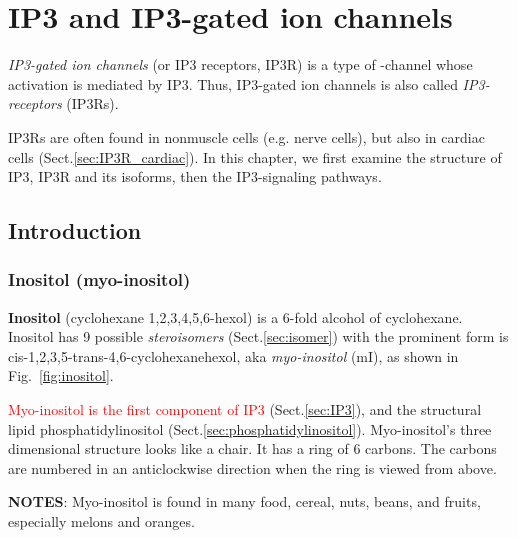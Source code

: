 

\chapter{IP3 and IP3-gated ion channels}
\label{chap:ip3-gated-ion}


{\it IP3-gated ion channels} (or IP3 receptors, IP3R) is a type of
-channel whose activation is mediated by IP3. Thus, IP3-gated ion
channels is also called {\it IP3-receptors} (IP3Rs). 

IP3Rs are often found in nonmuscle cells (e.g. nerve cells), but also in cardiac
cells (Sect.\ref{sec:IP3R_cardiac}). In this chapter, we first examine the
structure of IP3, IP3R and its isoforms, then the IP3-signaling pathways.


\section{Introduction}

\subsection{Inositol (myo-inositol)}
\label{sec:inositol}
\label{sec:myo-inositol}


{\bf Inositol} (cyclohexane 1,2,3,4,5,6-hexol) is a 6-fold alcohol of
cyclohexane. Inositol has 9 possible {\it steroisomers} (Sect.\ref{sec:isomer})
with the prominent form is cis-1,2,3,5-trans-4,6-cyclohexanehexol, aka {\it
myo-inositol} (mI), as shown in Fig.~\ref{fig:inositol}. 

\textcolor{red}{Myo-inositol is the first component of IP3}
(Sect.\ref{sec:IP3}), and the structural lipid phosphatidylinositol
(Sect.\ref{sec:phosphatidylinositol}).
Myo-inositol's three dimensional structure looks
like a chair. It has a ring of 6 carbons. The carbons are numbered in an
anticlockwise direction when the ring is viewed from above.

{\bf NOTES}: Myo-inositol is found in many food, cereal, nuts, beans,
and fruits, especially melons and oranges.

